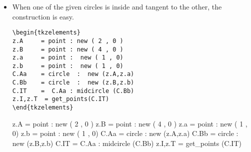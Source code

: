 \begin{enumerate}[label=(\roman*)]
\begin{itemize}
\begin{minipage}{.4\textwidth}
\begin{Verbatim}
\begin{tkzelements}
scale=.75
local a,b,c,d
z.A = point : new ( 0 , 0 )
z.B = point : new ( 4 , 0 )
z.a = point :  new ( 1 , 0)
z.b = point :  new ( 1 , 0)
C.Aa = circle  :  new (z.A,z.a)
C.Bb = circle  :  new (z.B,z.b)
L.AB = line :  new (z.A,z.B)
z.E = C.Aa.north
z.F = C.Bb.north
L.EF = line :  new (z.E,z.F)
C.IT =  C.Aa : midcircle (C.Bb)
z.I,z.T = get_points(C.IT) 
L.TF = C.Bb : tangent_from (z.I)
z.H = intersection (L.TF,C.IT)
z.E = intersection (L.TF,C.Aa)
z.F=L.TF.pb
\end{tkzelements}
\end{Verbatim}
\end{minipage}
\begin{minipage}{.6\textwidth}
\begin{tkzelements}
scale=.75
local a,b,c,d
z.A = point : new ( 0 , 0 )
z.B = point : new ( 4 , 0 )
z.a = point :  new ( 1 , 0)
z.b = point :  new ( 1 , 0)
C.Aa = circle  :  new (z.A,z.a)
C.Bb = circle  :  new (z.B,z.b)
L.AB = line :  new (z.A,z.B)
z.E = C.Aa.north
z.F = C.Bb.north
L.EF = line :  new (z.E,z.F)
C.IT =  C.Aa : midcircle (C.Bb)
z.I,z.T = get_points (C.IT) 
L.TF = C.Bb : tangent_from (z.I)
z.H = intersection (L.TF,C.IT)
z.E = intersection (L.TF,C.Aa)
z.F=L.TF.pb
\end{tkzelements}
\end{minipage}


\item   When one of the given circles is inside and tangent to the other, the construction is easy. 

\begin{minipage}{.4\textwidth}
\begin{Verbatim}
\begin{tkzelements}
z.A     = point : new ( 2 , 0 )
z.B     = point : new ( 4 , 0 )
z.a     = point :  new ( 1 , 0)
z.b     = point :  new ( 1 , 0)
C.Aa    = circle  :  new (z.A,z.a)
C.Bb    = circle  :  new (z.B,z.b)
C.IT    =  C.Aa : midcircle (C.Bb)
z.I,z.T  = get_points(C.IT)
\end{tkzelements}
\end{Verbatim}
\end{minipage}
\begin{minipage}{.6\textwidth}
\begin{tkzelements}
z.A = point : new ( 2 , 0 )
z.B = point : new ( 4 , 0 )
z.a = point :  new ( 1 , 0)
z.b = point :  new ( 1 , 0)
C.Aa = circle  :  new (z.A,z.a)
C.Bb = circle  :  new (z.B,z.b)
C.IT =  C.Aa : midcircle (C.Bb)
z.I,z.T = get_points (C.IT) 
\end{tkzelements}


\end{minipage}
\end{itemize}
\end{enumerate}
